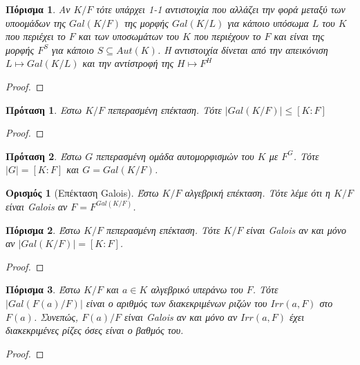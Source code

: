 \documentclass[oneside,a4paper]{article}
\newtheorem*{defn}{Ορισμός}
\newtheorem{prop}{Πρόταση}
\newtheorem{cor}{Πόρισμα}
\newcommand {\tl}{\textlatin}
\begin{document}
\begin{cor} Αν $K/F$ τότε υπάρχει 1-1 αντιστοιχία που αλλάζει την φορά μεταξύ των υποομάδων της $Gal(K/F)$ της μορφής $Gal(K/L)$ για κάποιο υπόσωμα $L$ του $K$ που περιέχει το $F$ και των υποσωμάτων του $K$ που περιέχουν το $F$ και είναι της μορφής $F^S$ για κάποιο $S \subseteq Aut(K)$. Η αντιστοιχία δίνεται από την απεικόνιση $L \mapsto Gal(K/L)$ και την αντίστροφή της $H \mapsto F^H$
\end{cor}
\begin{proof}
\end{proof}

\begin{prop}
	Εστω $K/F$ πεπερασμένη επέκταση. Τότε $|Gal(K/F)| \leq [K:F]$
\end{prop}

\begin{proof}
\end{proof}

\begin{prop}
	Έστω $G$ πεπερασμένη ομάδα αυτομορφισμών του $K$ με $F^G$. Τότε $|G| = [K:F]$ και $G = Gal(K/F)$.
\end{prop}

\begin{defn}[Επέκταση \tl{Galois}]
	Έστω $K/F$ αλγεβρική επέκταση. Τότε λέμε ότι η $K/F$ είναι \tl{Galois} αν $F = F^{Gal(K/F)}$.
\end{defn}

\begin{cor}
	Έστω $K/F$ πεπερασμένη επέκταση. Τότε $K/F$ είναι \tl{Galois} αν και μόνο αν $|Gal(K/F)| = [K:F]$.
\end{cor}
\begin{proof}
\end{proof}

\begin{cor} Έστω $K/F$ και $a\in K$ αλγεβρικό υπεράνω του $F$. Τότε $|Gal(F(a)/F)|$ είναι ο αριθμός των διακεκριμένων ριζών του $Irr(a,F)$ στο $F(a)$. Συνεπώς, $F(a)/F$ είναι \tl{Galois} αν και μόνο αν $Irr(a,F)$ έχει διακεκριμένες ρίζες όσες είναι ο βαθμός του.
\end{cor}
\begin{proof}
\end{proof}
\end{document}
